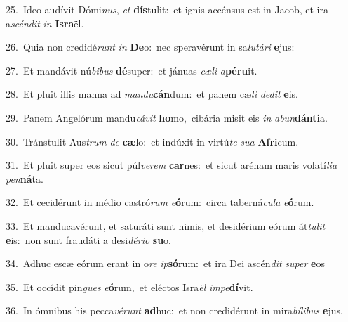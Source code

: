 {\numbfont\textcolor{\numbcolor}{25.}}~Ideo audívit Dómi\-\textit{nus}\-, \textit{et} \textbf{dís}\-tulit:~\star et ignis accénsus est in Jacob, et ira a\-\textit{scén}\-\textit{dit} \textit{in} \textbf{Is}\-\textbf{ra}ël.\par
{\numbfont\textcolor{\numbcolor}{26.}}~Quia non credidé\textit{runt} \textit{in} \textbf{De}\-o:~\star nec speravérunt in sa\-\textit{lu}\-\textit{tá}\textit{ri} \textbf{e}\-jus:\par
{\numbfont\textcolor{\numbcolor}{27.}}~Et mandávit nú\-\textit{bi}\-\textit{bus} \textbf{dé}\-super:~\star et jánuas \textit{cæ}\-\textit{li} \textit{a}\-\textbf{pé}\textbf{ru}it.\par
{\numbfont\textcolor{\numbcolor}{28.}}~Et pluit illis manna ad \textit{man}\-\textit{du}\textbf{cán}dum:~\star et panem cæ\textit{li} \textit{de}\-\textit{dit} \textbf{e}\-is.\par
{\numbfont\textcolor{\numbcolor}{29.}}~Panem Angelórum mandu\-\textit{cá}\-\textit{vit} \textbf{ho}\-mo,~\star cibária misit eis \textit{in} \textit{ab}\-\textit{un}\textbf{dán}\textbf{ti}a.\par
{\numbfont\textcolor{\numbcolor}{30.}}~Tránstulit Aus\textit{trum} \textit{de} \textbf{cæ}\-lo:~\star et indúxit in virtú\textit{te} \textit{su}\-\textit{a} \textbf{A}\-\textbf{fri}cum.\par
{\numbfont\textcolor{\numbcolor}{31.}}~Et pluit super eos sicut púl\-\textit{ve}\-\textit{rem} \textbf{car}\-nes:~\star et sicut arénam maris volatí\-\textit{li}\-\textit{a} \textit{pen}\-\textbf{ná}ta.\par
{\numbfont\textcolor{\numbcolor}{32.}}~Et cecidérunt in médio castró\textit{rum} \textit{e}\-\textbf{ó}rum:~\star circa taberná\-\textit{cu}\-\textit{la} \textit{e}\-\textbf{ó}rum.\par
{\numbfont\textcolor{\numbcolor}{33.}}~Et manducavérunt, et saturáti sunt nimis, et desidérium eórum át\-\textit{tu}\-\textit{lit} \textbf{e}\-is:~\star non sunt fraudáti a desi\-\textit{dé}\-\textit{ri}\textit{o} \textbf{su}\-o.\par
{\numbfont\textcolor{\numbcolor}{34.}}~Adhuc escæ eórum erant in o\textit{re} \textit{ip}\-\textbf{só}rum:~\star et ira Dei ascén\textit{dit} \textit{su}\-\textit{per} \textbf{e}\-os\par
{\numbfont\textcolor{\numbcolor}{35.}}~Et occídit pin\textit{gues} \textit{e}\-\textbf{ó}rum,~\star et eléctos Isra\textit{ël} \textit{im}\-\textit{pe}\textbf{dí}vit.\par
{\numbfont\textcolor{\numbcolor}{36.}}~In ómnibus his pecca\-\textit{vé}\-\textit{runt} \textbf{ad}\-huc:~\star et non credidérunt in mira\-\textit{bí}\-\textit{li}\textit{bus} \textbf{e}\-jus.\par
